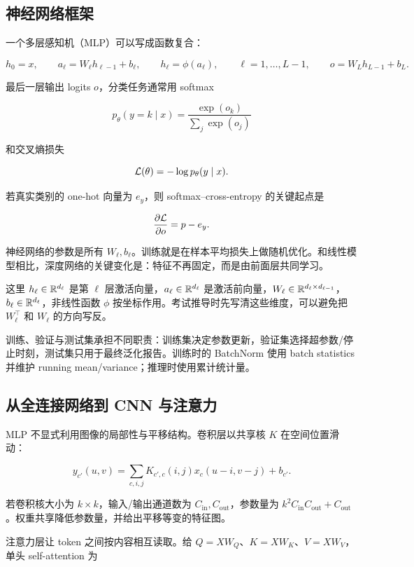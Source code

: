 \subsection{神经网络框架}

一个多层感知机（MLP）可以写成函数复合：

\[
  h_0=x,
  \qquad
  a_\ell=W_\ell h_{\ell-1}+b_\ell,
  \qquad
  h_\ell=\phi(a_\ell),
  \qquad \ell=1,\ldots,L-1,
  \qquad
  o=W_Lh_{L-1}+b_L.
\]

最后一层输出 logits \(o\)，分类任务通常用 softmax

\[
  p_\theta(y=k\mid x)
  =
  \frac{\exp(o_k)}{\sum_{j}\exp(o_j)}
\]

和交叉熵损失

\[
  \mathcal{L}(\theta)
  =
  -\log p_\theta(y\mid x).
\]

若真实类别的 one-hot 向量为 \(e_y\)，则 softmax--cross-entropy 的关键起点是

\[
  \frac{\partial\mathcal{L}}{\partial o}=p-e_y.
\]

神经网络的参数是所有 \(W_\ell,b_\ell\)。训练就是在样本平均损失上做随机优化。和线性模型相比，深度网络的关键变化是：特征不再固定，而是由前面层共同学习。

这里 \(h_\ell\in\mathbb{R}^{d_\ell}\) 是第 \(\ell\) 层激活向量，\(a_\ell\in\mathbb{R}^{d_\ell}\) 是激活前向量，\(W_\ell\in\mathbb{R}^{d_\ell\times d_{\ell-1}}\)，\(b_\ell\in\mathbb{R}^{d_\ell}\)，非线性函数 \(\phi\) 按坐标作用。考试推导时先写清这些维度，可以避免把 \(W_\ell^\top\) 和 \(W_\ell\) 的方向写反。

训练、验证与测试集承担不同职责：训练集决定参数更新，验证集选择超参数/停止时刻，测试集只用于最终泛化报告。训练时的 BatchNorm 使用 batch statistics 并维护 running mean/variance；推理时使用累计统计量。

\subsection{从全连接网络到 CNN 与注意力}

MLP 不显式利用图像的局部性与平移结构。卷积层以共享核 \(K\) 在空间位置滑动：

\[
  y_{c'}(u,v)=\sum_{c,i,j}K_{c',c}(i,j)x_c(u-i,v-j)+b_{c'}.
\]

若卷积核大小为 \(k\times k\)，输入/输出通道数为 \(C_{\mathrm{in}},C_{\mathrm{out}}\)，参数量为 \(k^2C_{\mathrm{in}}C_{\mathrm{out}}+C_{\mathrm{out}}\)。权重共享降低参数量，并给出平移等变的特征图。

注意力层让 token 之间按内容相互读取。给 \(Q=XW_Q\)、\(K=XW_K\)、\(V=XW_V\)，单头 self-attention 为

